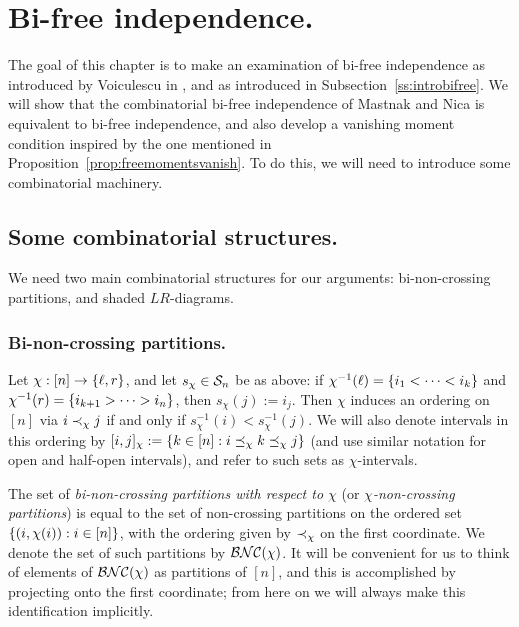 \chapter{Bi-free independence.}
\label{ch:bfi}

The goal of this chapter is to make an examination of bi-free independence as introduced by Voiculescu in \cite{voiculescu2014free}, and as introduced in Subsection~\ref{ss:introbifree}.
We will show that the combinatorial bi-free independence of Mastnak and Nica is equivalent to bi-free independence, and also develop a vanishing moment condition inspired by the one mentioned in Proposition~\ref{prop:freemomentsvanish}.
To do this, we will need to introduce some combinatorial machinery.

\section{Some combinatorial structures.}
We need two main combinatorial structures for our arguments: bi-non-crossing partitions, and shaded $LR$-diagrams.

\subsection{Bi-non-crossing partitions.}
\begin{definition}
	Let $\chi: [n]\to\left\{\ell, r\right\}$, and let $s_\chi \in \mathcal{S}_n$ be as above: if $\chi^{-1}(\ell) = \left\{i_1 < \cdots < i_k\right\}$ and $\chi^{-1}(r) = \left\{i_{k+1} > \cdots > i_n\right\}$, then $s_\chi(j) := i_j$.
	Then $\chi$ induces an ordering on $[n]$ via $i \prec_\chi j$ if and only if $s_\chi^{-1}(i) < s_\chi^{-1}(j)$.
	We will also denote intervals in this ordering by $[i, j]_\chi := \left\{k \in [n] : i \preceq_\chi k \preceq_\chi j\right\}$ (and use similar notation for open and half-open intervals), and refer to such sets as $\chi$-intervals.

	The set of \emph{bi-non-crossing partitions with respect to $\chi$} (or \emph{$\chi$-non-crossing partitions}) is equal to the set of non-crossing partitions on the ordered set $\left\{(i, \chi(i)) : i \in [n]\right\}$, with the ordering given by $\prec_\chi$ on the first coordinate.
	We denote the set of such partitions by $\mathcal{BNC}(\chi)$.
	It will be convenient for us to think of elements of $\mathcal{BNC}(\chi)$ as partitions of $[n]$, and this is accomplished by projecting onto the first coordinate; from here on we will always make this identification implicitly.
\end{definition}


